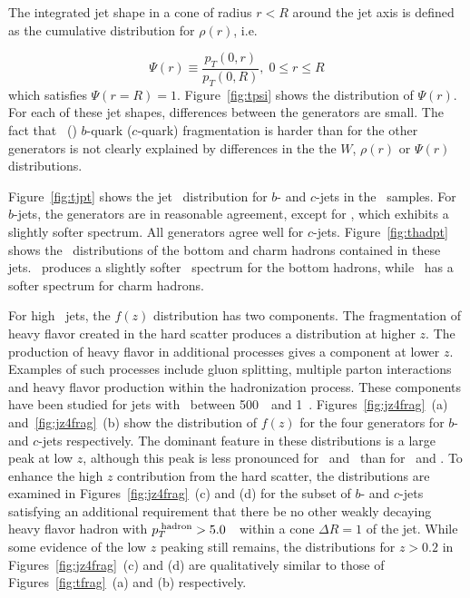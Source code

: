 The integrated jet shape in a cone of radius $r<R$ around the jet axis is defined as the cumulative distribution for $\rho(r)$, i.e.

$$
\Psi(r) \equiv \frac{p_T \left(0, r \right)}{p_T \left(0, R \right)},\; 0 \leq r \leq R 
$$
\noindent
which satisfies $\Psi(r = R) = 1$.
Figure~\ref{fig:tpsi} shows the distribution of $\Psi(r)$. For each of these jet shapes, differences between the 
generators are small. The fact that \Herwigpp\ (\Herwig) $b$-quark ($c$-quark) fragmentation is harder than for the other generators is not clearly explained by differences in the the $W$, $\rho(r)$ or $\Psi(r)$ distributions.

Figure~\ref{fig:tjpt} shows the jet \pT\ distribution for $b$- and  $c$-jets in the \ttbar\ samples.
For $b$-jets, the generators are in reasonable agreement, except for \Herwigpp, which exhibits a slightly softer
spectrum.  All generators agree well for $c$-jets.  Figure~\ref{fig:thadpt} shows the \pT\ distributions
of the bottom and charm hadrons contained in these jets.  \Herwigpp\ produces a slightly
softer \pT\ spectrum for the bottom hadrons, while \Herwig\ has a softer spectrum for charm hadrons.  

For high \pT\ jets, the $f(z)$ distribution has two components. The fragmentation of heavy flavor created in the hard scatter produces a distribution at higher $z$. The production of heavy flavor in additional processes gives a component at lower $z$. Examples of such processes include gluon splitting, multiple parton interactions and heavy flavor production within the hadronization process.  These components have been studied for jets with
\ptJet\ between 500~\GeV\ and 1~\TeV. Figures~\ref{fig:jz4frag}~(a) and~\ref{fig:jz4frag}~(b) show the distribution of $f(z)$ for the four generators for $b$- and  $c$-jets respectively.  The dominant feature in these distributions is a large peak at low $z$, although this peak is less pronounced for \Herwig\ and \Herwigpp\ than for \Pythia\ and \PythiaE. To enhance the high $z$ contribution from the hard scatter, the distributions are examined
in Figures~\ref{fig:jz4frag}~(c) and (d) for the subset of $b$- and  $c$-jets satisfying an additional requirement that there be no other weakly decaying heavy flavor hadron with $p_T^{\rm\;hadron}>5.0$~\GeV\ within a cone $\Delta R=1$ of the jet.  While some evidence of the low $z$ peaking still remains, the distributions for $z>0.2$ in Figures~\ref{fig:jz4frag}~(c) and (d) are qualitatively similar to those of Figures~\ref{fig:tfrag}~(a) and (b) respectively.
\clearpage

